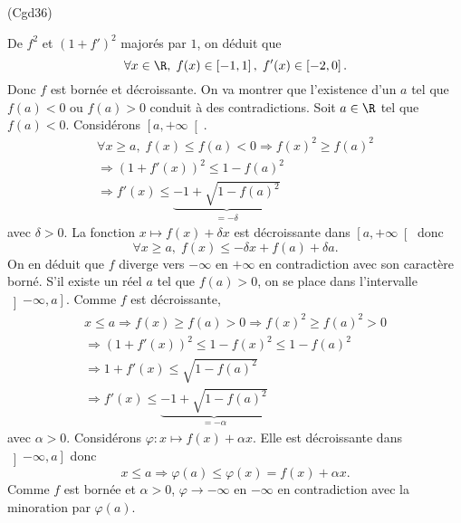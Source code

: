 \begin{tiny}(Cgd36)\end{tiny} De $f^2$ et $(1+f')^2$ majorés par $1$, on déduit que 
\[
  \forall x \in \R, \; f(x) \in \left[-1,1\right], \; f'(x) \in \left[-2,0\right].
\]
Donc $f$ est bornée et décroissante.\newline
On va montrer que l'existence d'un $a$ tel que $f(a) < 0$ ou $f(a) > 0$ conduit à des contradictions.\newline
Soit $a\in \R$ tel que $f(a)<0$. Considérons $\left[ a, +\infty\right[$.
\begin{multline*}
  \forall x \geq a,\; f(x) \leq f(a)<0
  \Rightarrow f(x)^2 \geq f(a)^2 \\
  \Rightarrow (1+f'(x))^2 \leq 1 - f(a)^2 \\
  \Rightarrow f'(x) \leq \underset{ = - \delta}{\underbrace{- 1 + \sqrt{1 - f(a)^2}}}
\end{multline*}
avec $\delta >0$. La fonction $x \mapsto f(x) + \delta x$ est décroissante dans $\left[ a, +\infty\right[$ donc
\[
  \forall x \geq a, \;
  f(x) \leq -\delta x + f(a) + \delta a .
\]
On en déduit que $f$ diverge vers $-\infty$ en $+\infty$ en contradiction avec son caractère borné.\newline
S'il existe un réel $a$ tel que $f(a)>0$, on se place dans l'intervalle $\left] - \infty, a \right]$. Comme $f$ est décroissante,
\begin{multline*}
  x  \leq a \Rightarrow f(x) \geq f(a) > 0 
  \Rightarrow f(x)^2 \geq f(a)^2 > 0\\
  \Rightarrow (1+f'(x))^2 \leq 1 - f(x)^2 \leq 1 - f(a)^2 \\
  \Rightarrow  1 + f'(x) \leq \sqrt{1-f(a)^2}\\
  \Rightarrow f'(x) \leq \underset{=-\alpha}{\underbrace{-1 +\sqrt{1-f(a)^2}}}
\end{multline*}
avec $\alpha >0$. Considérons $\varphi: x\mapsto f(x) + \alpha x$.\newline
Elle est décroissante dans $\left] - \infty, a \right]$ donc
\[
  x \leq a \Rightarrow \varphi (a) \leq \varphi(x) = f(x) + \alpha x .
\]
Comme $f$ est bornée et $\alpha > 0$, $\varphi \rightarrow - \infty$ en $-\infty$ en contradiction avec la minoration par $\varphi(a)$.
